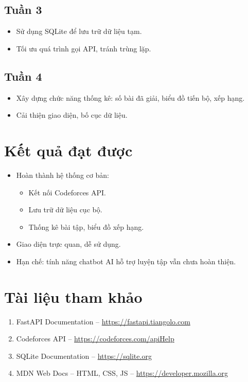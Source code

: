\documentclass[12pt,a4paper]{article}
\begin{document}
	\subsection*{Tuần 3}
	\begin{itemize}
		\item Sử dụng SQLite để lưu trữ dữ liệu tạm.
		\item Tối ưu quá trình gọi API, tránh trùng lặp.
	\end{itemize}
	
	\subsection*{Tuần 4}
	\begin{itemize}
		\item Xây dựng chức năng thống kê: số bài đã giải, biểu đồ tiến bộ, xếp hạng.
		\item Cải thiện giao diện, bố cục dữ liệu.
	\end{itemize}
	
	\section{Kết quả đạt được}
	
	\begin{itemize}
		\item Hoàn thành hệ thống cơ bản:
		\begin{itemize}
			\item Kết nối Codeforces API.
			\item Lưu trữ dữ liệu cục bộ.
			\item Thống kê bài tập, biểu đồ xếp hạng.
		\end{itemize}
		\item Giao diện trực quan, dễ sử dụng.
		\item Hạn chế: tính năng chatbot AI hỗ trợ luyện tập vẫn chưa hoàn thiện.
	\end{itemize}
	
	\section{Tài liệu tham khảo}
	
	\begin{enumerate}
		\item FastAPI Documentation – \url{https://fastapi.tiangolo.com}
		\item Codeforces API – \url{https://codeforces.com/apiHelp}
		\item SQLite Documentation – \url{https://sqlite.org}
		\item MDN Web Docs – HTML, CSS, JS – \url{https://developer.mozilla.org}
	\end{enumerate}
	
\end{document}
